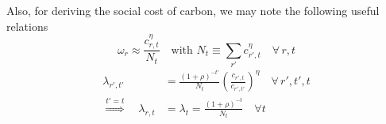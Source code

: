\documentclass[preprint,3p,authoryear]{elsarticle}
\begin{document}
Also, for deriving the social cost of carbon, we may note the following useful relations 
\begin{equation}
  \label{eq:Negishi}
  \omega_{r}\approx \frac{c_{r,t}^{\eta}}{N_{t}}\quad\text{with }N_t\equiv\sum_{r'}c_{r',t}^{\eta} \quad\forall\,r,t
\end{equation}
\begin{subequations}
  \label{eq:lambda}
\begin{align} \lambda_{r',t'}&=\frac{(1+\rho)^{-t'}}{N_t}\left(\frac{c_{r',t}}{c_{r',t'}}\right)^{\eta}\quad\forall\, r',t',t\label{subeq:delta_rptp}\\
  \overset{t'=t}{\Rightarrow}\quad
  \lambda_{r,t}&=\lambda_{t}=\frac{(1+\rho)^{-t}}{N_t}\quad \forall t\label{subeq:delta_rt}
\end{align}
\end{subequations}
\end{document}
